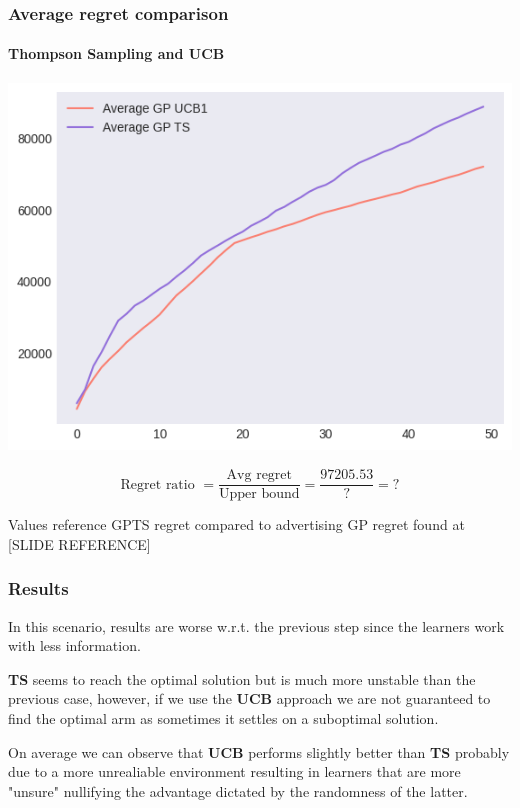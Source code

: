
\begin{frame}[plain]

\frametitle{Average regret comparison}
\framesubtitle{Thompson Sampling and UCB}

\begin{center}
	\includegraphics[scale=0.45]{img/Graphs/uncertain_alpha_unit/image6.png}
\end{center}

\begin{displaymath}
	\text{Regret ratio } = \frac{\text{Avg regret}}{\text{Upper bound}} = \frac{97205.53}{?} = ?
\end{displaymath}

\scriptsize Values reference GPTS regret compared to advertising GP regret found at [SLIDE REFERENCE]


\end{frame}


\begin{frame}

\frametitle{Results}

In this scenario, results are worse w.r.t. the previous step since the learners work with less information.

\textbf{TS} seems to reach the optimal solution but is much more unstable than the previous case, however, if we use the \textbf{UCB} approach we are not guaranteed to find the optimal arm as sometimes it settles on a suboptimal solution.

On average we can observe that \textbf{UCB} performs slightly better than \textbf{TS} probably due to a more unrealiable environment resulting in learners that are more "unsure" nullifying the advantage dictated by the randomness of the latter.

\end{frame}

